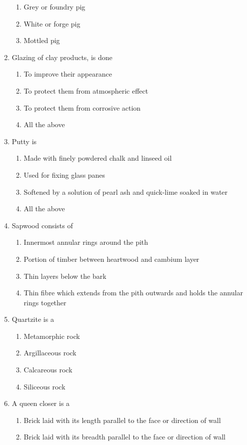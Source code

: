 \documentclass[11pt,a4paper]{article}
\begin{document}
\begin{enumerate}
\begin{enumerate}[label=\Alph*.]
\item{Grey or foundry pig}
\item{White or forge pig}
\item{Mottled pig}
\end{enumerate}
\item{Glazing of clay products, is done}
\begin{enumerate}[label=\Alph*.]
\item{To improve their appearance}
\item{To protect them from atmospheric effect}
\item{To protect them from corrosive action}
\item{All the above}
\end{enumerate}
\item{Putty is}
\begin{enumerate}[label=\Alph*.]
\item{Made with finely powdered chalk and linseed oil}
\item{Used for fixing glass panes}
\item{Softened by a solution of pearl ash and quick-lime soaked in water}
\item{All the above}
\end{enumerate}
\item{Sapwood consists of}
\begin{enumerate}[label=\Alph*.]
\item{Innermost annular rings around the pith}
\item{Portion of timber between heartwood and cambium layer}
\item{Thin layers below the bark}
\item{Thin fibre which extends from the pith outwards and holds the annular rings together}
\end{enumerate}
\item{Quartzite is a}
\begin{enumerate}[label=\Alph*.]
\item{Metamorphic rock}
\item{Argillaceous rock}
\item{Calcareous rock}
\item{Siliceous rock}
\end{enumerate}
\item{A queen closer is a}
\begin{enumerate}[label=\Alph*.]
\item{Brick laid with its length parallel to the face or direction of wall}
\item{Brick laid with its breadth parallel to the face or direction of wall}

\end{enumerate}
\end{enumerate}
\end{document}
